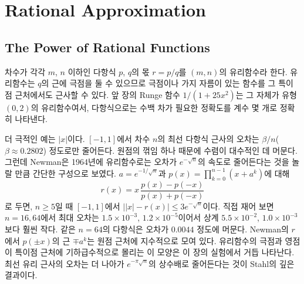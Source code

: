 \chapter{Rational Approximation}
\label{ch:rational}


\section{The Power of Rational Functions}
\label{sec:rational-power}

차수가 각각 $m$, $n$ 이하인 다항식 $p$, $q$의 몫 $r=p/q$를  $(m,n)$의 유리함수라 한다. 유리함수는 $q$의 근에 극점을 둘 수 있으므로 극점이나 가지 자름이 있는 함수를 그 특이점 근처에서도 근사할 수 있다. 앞 장의 Runge 함수 $1/(1+25x^2)$는 그 자체가 유형 $(0,2)$의 유리함수여서, 다항식으로는 수백 차가 필요한 정확도를 계수 몇 개로 정확히 나타낸다.

더 극적인 예는 $|x|$이다. $[-1,1]$에서 차수 $n$의 최선 다항식 근사의 오차는 $\beta/n$($\beta\approx0.2802$) 정도로만 줄어든다\cite{trefethen2019atap}. 원점의 꺾임 하나 때문에 수렴이 대수적인 데 머문다. 그런데 Newman은 1964년에 유리함수로는 오차가 $e^{-\sqrt n}$의 속도로 줄어든다는 것을 놀랄 만큼 간단한 구성으로 보였다\cite{newman1964}. $a=e^{-1/\sqrt n}$과 $p(x)=\prod_{k=0}^{n-1}(x+a^k)$에 대해
\[
r(x)=x\,\frac{p(x)-p(-x)}{p(x)+p(-x)}
\]
로 두면, $n\ge5$일 때 $[-1,1]$에서 $\bigl||x|-r(x)\bigr|\le3e^{-\sqrt n}$이다. 직접 재어 보면 $n=16,64$에서 최대 오차는 $1.5\times10^{-3}$, $1.2\times10^{-5}$이어서 상계 $5.5\times10^{-2}$, $1.0\times10^{-3}$보다 훨씬 작다. 같은 $n=64$의 다항식은 오차가 $0.0044$ 정도에 머문다. Newman의 $r$에서 $p(\pm x)$의 근 $\mp a^k$는 원점 근처에 지수적으로 모여 있다. 유리함수의 극점과 영점이 특이점 근처에 기하급수적으로 몰리는 이 모양은 이 장의 실험에서 거듭 나타난다. 최선 유리 근사의 오차는 더 나아가 $e^{-\pi\sqrt n}$의 상수배로 줄어든다는 것이 Stahl의 깊은 결과이다\cite{trefethen2019atap,stahl2003}.

